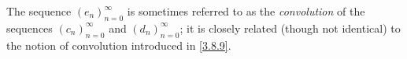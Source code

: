 \begin{remark}\label{4.4.2}
  The sequence \((e_n)_{n = 0}^\infty\) is sometimes referred to as the \emph{convolution} of the sequences \((c_n)_{n = 0}^\infty\) and \((d_n)_{n = 0}^\infty\);
  it is closely related (though not identical) to the notion of convolution introduced in \cref{3.8.9}.
\end{remark}